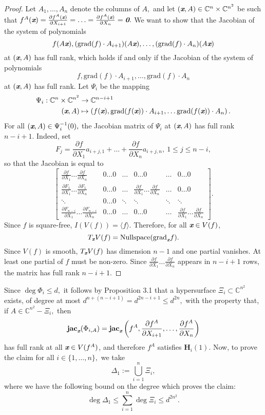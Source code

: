 \documentclass[sigconf]{acmart}
\def\bz{\textit{\textbf{0}}}
\def\xb{\textit{\textbf{x}}}
\def\C{\mathbb{C}}
\def\jac{ \textbf{jac}}
\def\grad{\textrm{grad}}
\def\pa{\partial}
\begin{document}
\begin{proof}
Let $A_1,\hdots,A_n$ denote the columns of $A,$ and let $(\xb,A) \in \C^n \times \C^{n^2}$ be such that 
$f^A(\xb) = \frac{\partial f^A(\xb)}{\partial X_{i+1}}=\hdots= \frac{\partial f^A(\xb)}{\partial X_n}=\bz.$
We want to show that the Jacobian of the system of polynomials 
\[
f(A\xb),(\grad(f)\cdot A_{i+1})(A\xb),\hdots, (\grad(f)\cdot A_n)(A\xb)
\]
at $(\xb,A)$ has full rank, which holds if and only if the Jacobian of the system of polynomials 
\[
f,\grad(f)\cdot A_{i+1},\hdots, \grad(f)\cdot A_n
\]
at $(\xb,A)$ has full rank. Let $\Psi_i$ be the mapping
%
\begin{align*}
    \Psi_i: \C^n \times \C^{n^2} &\rightarrow \C^{n-i+1} \\
       (\xb,A) &\mapsto 
       \left(f(\xb),\grad(f(\xb))\cdot 
A_{i+1},\hdots
\grad(f(\xb))\cdot 
A_{n}
\right).
\end{align*}
%
For all $(\xb,A) \in \Psi_i^{-1}(0),$ the Jacobian matrix of $\Psi_i$ at $(\xb,A)$ has full rank $n-i+1$. Indeed, set 
\[
F_j = \frac{\pa f}{\pa X_1} a_{i+j,1} + \hdots + \frac{\pa f}{\pa X_n}a_{i+j,n}, ~1 \leq j \leq n-i,
\]
so that the Jacobian is equal to
\[
\left[ 
\begin{array}{cccccc}
\frac{\pa f}{\pa X_1} \hdots \frac{\pa f}{\pa X_n}            &0\hdots 0&\hdots& 0 \hdots 0                                         & \hdots & 0\hdots 0 \\ 
\frac{\pa F_{1}}{\pa X_1}\hdots \frac{\pa F_{1}}{\pa X_n}     &0\hdots 0&\hdots& \frac{\pa f}{\pa X_1} \hdots \frac{\pa f}{\pa X_n} & \hdots & 0\hdots 0 \\
\ddots                                                        &0\hdots 0&\ddots&\ddots                                              & \ddots & \ddots \\
\frac{\pa F_{n-i}}{\pa X_1}\hdots \frac{\pa F_{n-i}}{\pa X_n} &0\hdots 0&\hdots&0 \hdots 0&  \hdots & \frac{\pa f}{\pa X_1} \hdots \frac{\pa f}{\pa X_n}  
\end{array}
\right]. 
\] 
Since $f$ is square-free, $I(V(f)) = \langle f \rangle.$ Therefore, for all $\xb \in V(f)$, 
\[
T_{\xb} V(f) = \textrm{Nullspace}(\grad_{\xb} f).
\]
Since $V(f)$ is smooth, $T_{\xb} V(f)$ has dimension $n-1$ and one partial vanishes. At least one partial of $f$ must be non-zero. Since  $\frac{\pa f}{\pa X_1} \hdots \frac{\pa f}{\pa X_n}$ appears in $n-i+1$ rows, the matrix has full rank $n-i+1$.
\end{proof}
%
Since $\deg \Phi_i \leq d,$ it follows by Proposition 3.1 that a hypersurface $\Xi_i \subset \C^{n^2}$ exists, of degree at most $d^{n+(n-i+1)}=d^{2n-i+1}\leq d^{2n},$ with the property that, if $A \in \C^{n^2}-\Xi_i,$ then 
%
\[
 \jac_{\xb} (\Phi_{i,A})=\jac_\xb \left(f^A,\frac{\pa f^A}{\pa X_{i+1}},\hdots,\frac{\pa f^A}{\pa X_n}\right)
\]
has full rank at all $\xb \in V(f^A)$, and therefore $f^A$ satisfies $\textbf{H}_i(1)$. Now, to prove the claim for all $i \in \{1,\hdots,n\},$ we take
\[
\Delta_1 := \bigcup_{i=1}^n \Xi_i,
\]
where we have the following bound on the degree which proves the claim:
\[
\deg \Delta_1 \leq \sum_{i=1}^n \deg \Xi_i  \leq d^{2n^2}.
\] 
\end{document}
